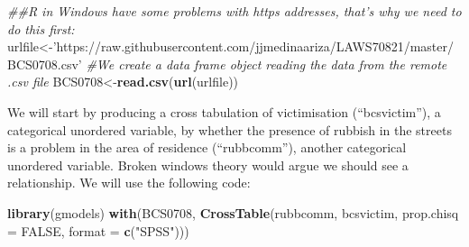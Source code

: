 \documentclass[]{book}
\newenvironment{Shaded}{\begin{snugshade}}{\end{snugshade}}
\newcommand{\CommentTok}[1]{\textcolor[rgb]{0.56,0.35,0.01}{\textit{#1}}}
\newcommand{\DataTypeTok}[1]{\textcolor[rgb]{0.13,0.29,0.53}{#1}}
\newcommand{\KeywordTok}[1]{\textcolor[rgb]{0.13,0.29,0.53}{\textbf{#1}}}
\newcommand{\NormalTok}[1]{#1}
\newcommand{\OtherTok}[1]{\textcolor[rgb]{0.56,0.35,0.01}{#1}}
\newcommand{\StringTok}[1]{\textcolor[rgb]{0.31,0.60,0.02}{#1}}
\theoremstyle{definition}
\theoremstyle{definition}
\theoremstyle{definition}
\theoremstyle{remark}
\begin{document}
\begin{Shaded}
\begin{Highlighting}[]
\CommentTok{##R in Windows have some problems with https addresses, that's why we need to do this first:}
\NormalTok{urlfile<-}\StringTok{'https://raw.githubusercontent.com/jjmedinaariza/LAWS70821/master/BCS0708.csv'}
\CommentTok{#We create a data frame object reading the data from the remote .csv file}
\NormalTok{BCS0708<-}\KeywordTok{read.csv}\NormalTok{(}\KeywordTok{url}\NormalTok{(urlfile))}
\end{Highlighting}
\end{Shaded}

We will start by producing a cross tabulation of victimisation
(``bcsvictim''), a categorical unordered variable, by whether the
presence of rubbish in the streets is a problem in the area of residence
(``rubbcomm''), another categorical unordered variable. Broken windows
theory would argue we should see a relationship. We will use the
following code:

\begin{Shaded}
\begin{Highlighting}[]
\KeywordTok{library}\NormalTok{(gmodels)}
\KeywordTok{with}\NormalTok{(BCS0708, }\KeywordTok{CrossTable}\NormalTok{(rubbcomm, bcsvictim, }\DataTypeTok{prop.chisq =} \OtherTok{FALSE}\NormalTok{, }\DataTypeTok{format =} \KeywordTok{c}\NormalTok{(}\StringTok{"SPSS"}\NormalTok{)))}
\end{Highlighting}
\end{Shaded}
\end{document}
